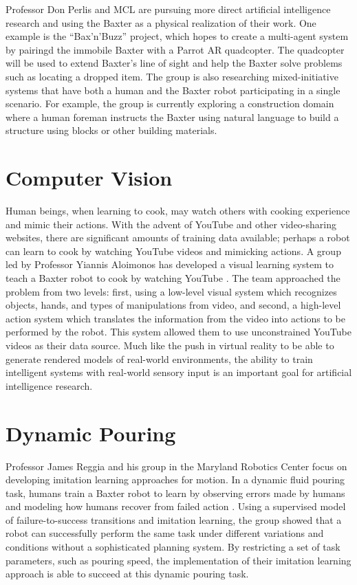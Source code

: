 \documentclass[DIV=calc, fontsize=12pt, twocolumn]{scrartcl}
\begin{document}
Professor Don Perlis and MCL are pursuing more direct artificial intelligence research and using the Baxter as a physical realization of their work. One example is the “Bax’n’Buzz” project, which hopes to create a multi-agent system by pairingd the immobile Baxter with a Parrot AR quadcopter. The quadcopter will be used to extend Baxter’s line of sight and help the Baxter solve problems such as locating a dropped item. The group is also researching mixed-initiative systems that have both a human and the Baxter robot participating in a single scenario. For example, the group is currently exploring a construction domain where a human foreman instructs the Baxter using natural language to build a structure using blocks or other building materials.

\section*{Computer Vision}

Human beings, when learning to cook, may watch others with cooking experience and mimic their actions. With the advent of YouTube and other video-sharing websites, there are significant amounts of training data available; perhaps a robot can learn to cook by watching YouTube videos and mimicking actions. A group led by Professor Yiannis Aloimonos has developed a visual learning system to teach a Baxter robot to cook by watching YouTube \cite{yang_robot_2015}. The team approached the problem from two levels: first, using a low-level visual system which recognizes objects, hands, and types of manipulations from video, and second, a high-level action system which translates the information from the video into actions to be performed by the robot. This system allowed them to use unconstrained YouTube videos as their data source. Much like the push in virtual reality to be able to generate rendered models of real-world environments, the ability to train intelligent systems with real-world sensory input is an important goal for artificial intelligence research.

\section*{Dynamic Pouring}

Professor James Reggia and his group in the Maryland Robotics Center focus on developing imitation learning approaches for motion. In a dynamic fluid pouring task, humans train a Baxter robot to learn by observing errors made by humans and modeling how humans recover from failed action \cite{langsfeld_incorporating_2014}. Using a supervised model of failure-to-success transitions and imitation learning, the group showed that a robot can successfully perform the same task under different variations and conditions without a sophisticated planning system. By restricting a set of task parameters, such as pouring speed, the implementation of their imitation learning approach is able to succeed at this dynamic pouring task.
\end{document}
